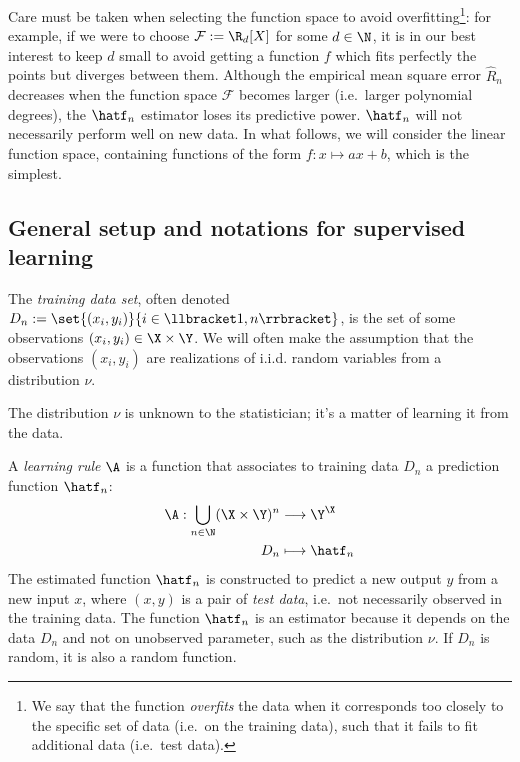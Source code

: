 \documentclass[toc]{../cs-classes/cs-classes}
\begin{document}
Care must be taken when selecting the function space to avoid overfitting\footnote{We say that the function \emph{overfits} the data when it corresponds too closely to the specific set of data (i.e.~on the training data), such that it fails to fit additional data (i.e.~test data).}: for example, if we were to choose $\mathcal{F}:=\R_d[X]$ for some $d\in\N$, it is in our best interest to keep $d$ small to avoid getting a function $f$ which fits perfectly the points but diverges between them. Although the empirical mean square error $\hat{R}_n$ decreases when the function space $\mathcal{F}$ becomes larger (i.e.~larger polynomial degrees), the $\hatf_n$ estimator loses its predictive power. $\hatf_n$ will not necessarily perform well on new data. In what follows, we will consider the linear function space, containing functions of the form $f:x\mapsto ax+b$, which is the simplest.

\subsection{General setup and notations for supervised learning}
\begin{definition}
    The \emph{training data set}, often denoted $D_n:=\set{(x_i, y_i)}{i\in\llbracket 1, n \rrbracket}$, is the set of some observations $(x_i, y_i)\in\X\times\Y$. We will often make the assumption that the observations $(x_i, y_i)$ are realizations of i.i.d. random variables from a distribution $\nu$.
\end{definition}

The distribution $\nu$ is unknown to the statistician; it's a matter of learning it from the data.

\begin{definition}
    A \emph{learning rule} $\A$ is a function that associates to training data $D_n$ a prediction function $\hatf_n$:
    \begin{equation*}
        \begin{aligned}
            \A: \bigcup_{n\in\N} (\X\times\Y)^n &\longrightarrow \Y^\X\\
            D_n &\longmapsto \hatf_n
        \end{aligned}
    \end{equation*}
    The estimated function $\hatf_n$ is constructed to predict a new output $y$ from a new input $x$, where $(x, y)$ is a pair of \emph{test data}, i.e.~not necessarily observed in the training data. The function $\hatf_n$ is an estimator because it depends on the data $D_n$ and not on unobserved parameter, such as the distribution $\nu$. If $D_n$ is random, it is also a random function.
\end{definition}
\end{document}
